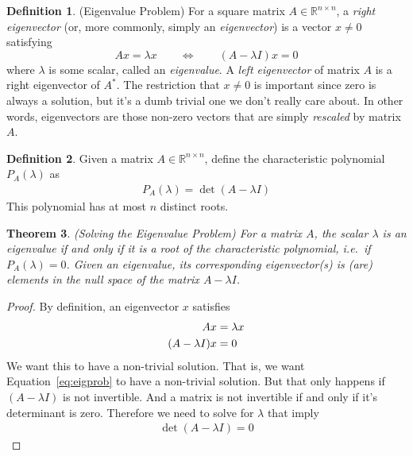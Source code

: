 \documentclass[12pt]{article}
\theoremstyle{plain}
\newtheorem{thm}{Theorem}[section]
\theoremstyle{definition}
\newtheorem{defn}[thm]{Definition}
\theoremstyle{remark}
\newcommand{\R}{\mathbb{R}}
\begin{document}
\begin{defn}{(Eigenvalue Problem)}
For a square matrix $A \in \R^{n\times n}$, a \emph{right eigenvector}
(or, more commonly, simply an \emph{eigenvector}) is a vector $x\neq 0$
satisfying
\begin{equation}
  Ax = \lambda x
  \qquad \Leftrightarrow \qquad
  (A-\lambda I) x = 0
\end{equation}
where $\lambda$ is some scalar, called an \emph{eigenvalue}.  A
\emph{left eigenvector} of matrix $A$ is a right eigenvector of $A^*$.
The restriction that $x\neq 0$ is important since zero is always a
solution, but it's a dumb trivial one we don't really care about.  In
other words, eigenvectors are those non-zero vectors that are simply
\emph{rescaled} by matrix $A$.
\end{defn}

\begin{defn}
Given a matrix $A\in \R^{n\times n}$, define the characteristic
polynomial $P_A(\lambda)$ as
\begin{align}
  \label{chareqn}
  P_A(\lambda) = \det(A-\lambda I)
\end{align}
This polynomial has at most $n$ distinct roots.
\end{defn}

\begin{thm}\emph{(Solving the Eigenvalue Problem)}
For a matrix $A$, the scalar $\lambda$ is an eigenvalue if and only if
it is a root of the characteristic polynomial, i.e.\ if
$P_A(\lambda)=0$.  Given an eigenvalue, its corresponding eigenvector(s)
is (are) elements in the null space of the matrix $A-\lambda I$.
\end{thm}
\begin{proof}
By definition, an eigenvector $x$ satisfies
\begin{align}
  A x &= \lambda x\notag\\
  (A- \lambda I)x &= 0
  \label{eq:eigprob}
\end{align}
We want this to have a non-trivial solution. That is, we want
Equation~\ref{eq:eigprob} to have a non-trivial solution. But that only
happens if $(A-\lambda I)$ is not invertible. And a matrix is not
invertible if and only if it's determinant is zero. Therefore we need to
solve for $\lambda$ that imply
\begin{align*}
  \det(A-\lambda I)=0
\end{align*}


\end{proof}
\end{document}

